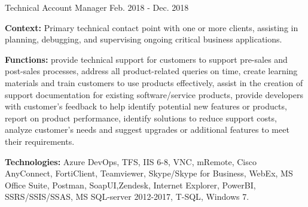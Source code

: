 \begin{cventries}
  \cventry
    {Technical Account Manager} %
    {} %
    {} %
    {Feb. 2018 - Dec. 2018} %
    {
      \begin{cvitems} %
		\item[] {\textbf{Context:} Primary technical contact point with one or more clients, assisting in planning, debugging, and supervising ongoing critical business applications.}
		\item[] {\textbf{Functions:} provide technical support for customers to support pre-sales and post-sales processes, address all product-related queries on time, create learning materials and train customers to use products effectively, assist in the creation of support documentation for existing software/service products, provide developers with customer's feedback to help identify potential new features or products, report on product performance, identify solutions to reduce support costs, analyze customer's needs and suggest upgrades or additional features to meet their requirements.}		
		\item[] {\textbf{Technologies:} \textcolor{rainbowcolor-green}{Azure DevOps}, \textcolor{rainbowcolor-green}{TFS}, \textcolor{rainbowcolor-green}{IIS 6-8}, \textcolor{rainbowcolor-green}{VNC}, \textcolor{rainbowcolor-green}{mRemote}, \textcolor{rainbowcolor-green}{Cisco AnyConnect}, %
\textcolor{rainbowcolor-green}{FortiClient}, \textcolor{rainbowcolor-green}{Teamviewer}, \textcolor{rainbowcolor-green}{Skype/Skype for Business}, \textcolor{rainbowcolor-green}{WebEx}, \textcolor{rainbowcolor-green}{MS Office Suite}, \textcolor{rainbowcolor-green}{Postman}, \textcolor{rainbowcolor-green}{SoapUI},\textcolor{rainbowcolor-green}{Zendesk}, \textcolor{rainbowcolor-green}{Internet Explorer}, \textcolor{rainbowcolor-green}{PowerBI}, \textcolor{rainbowcolor-green}{SSRS/SSIS/SSAS}, \textcolor{rainbowcolor-green}{MS SQL-server 2012-2017},  \textcolor{rainbowcolor-indigo}{T-SQL}, \textcolor{rainbowcolor-orange}{Windows 7}.}		
      \end{cvitems}
    } 
    

\end{cventries}
